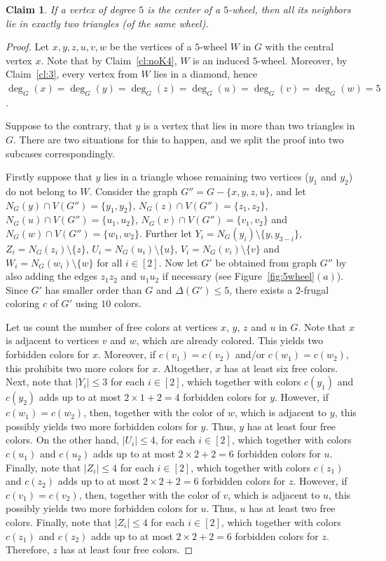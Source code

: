 \documentclass[10pt,a4paper]{article}
\newtheorem{claim}{Claim}
\begin{document}
\begin{claim} If a vertex of degree $5$ is the center of a $5$-wheel, then all its neighbors lie in  exactly two triangles (of the same wheel).
\label{cl:8}
\end{claim} 
\begin{proof}
Let $x,y,z,u,v,w$ be the vertices of a $5$-wheel $W$ in $G$ with the central vertex $x$. 
Note that by Claim~\ref{cl:noK4}, $W$ is an induced $5$-wheel. Moreover, by Claim~\ref{cl:3}, every vertex from $W$ lies in a diamond, hence $\deg_G(x)=\deg_G(y)=\deg_G(z)=\deg_G(u)=\deg_G(v)=\deg_G(w)=5$. 

Suppose to the contrary, that $y$ is a vertex that lies in more than two triangles in $G$. There are two situations for this to happen, and we split the proof into two subcases correspondingly.

Firstly suppose that $y$ lies in a triangle whose remaining two vertices ($y_1$ and $y_2$) do not belong to $W$. Consider the graph $G''=G-\{x,y,z,u\}$, and let $N_G(y) \cap V(G'')=\{y_1,y_2\}$, $N_G(z) \cap V(G'')=\{z_1,z_2\}$, $N_G(u) \cap V(G'')=\{u_1,u_2\}$, $N_G(v) \cap V(G'')=\{v_1,v_2\}$ and $N_G(w) \cap V(G'')=\{w_1,w_2\}$. Further let $Y_i=N_G(y_i)\setminus\{y,y_{3-i}\}$, $Z_i=N_G(z_i)\setminus\{z\}$, $U_i=N_G(u_i)\setminus\{u\}$, $V_i=N_G(v_i)\setminus\{v\}$ and $W_i=N_G(w_i)\setminus\{w\}$ for all $i \in [2]$. %
Now let $G'$ be obtained from graph $G''$ by also adding the edges $z_1z_2$ and $u_1u_2$ if necessary (see Figure~\ref{fig:5wheel}$(a)$). Since $G'$ has smaller order than $G$ and $\Delta(G') \le 5$, there exists a $2$-frugal coloring $c$ of $G'$ using $10$ colors. 

Let us count the number of free colors at vertices $x$, $y$, $z$ and $u$ in $G$. Note that $x$ is adjacent to vertices $v$ and $w$, which are already colored. This yields two forbidden colors for $x$. Moreover, if $c(v_1)=c(v_2)$ and/or $c(w_1)=c(w_2)$, this prohibits two more colors for $x$. Altogether, $x$ has at least six free colors. Next, note that $|Y_i| \le 3$ for each $i\in [2]$, which together with colors $c(y_1)$ and $c(y_2)$ adds up to at most $2 \times 1 + 2=4$ forbidden colors for $y$. However, if $c(w_1)=c(w_2)$, then, together with the color of $w$, which is adjacent to $y$, this possibly yields two more forbidden colors for $y$. Thus, $y$ has at least four free colors. On the other hand, $|U_i|\le 4$, for each $i\in [2]$, which together with colors $c(u_1)$ and $c(u_2)$ adds up to at most $2 \times 2 + 2=6$ forbidden colors for $u$.
Finally, note that $|Z_i| \le 4$ for each $i\in [2]$, which together with colors $c(z_1)$ and $c(z_2)$ adds up to at most $2 \times 2 + 2=6$ forbidden colors for $z$. 
However, if $c(v_1)=c(v_2)$, then, together with the color of $v$, which is adjacent to $u$, this possibly yields two more forbidden colors for $u$. Thus, $u$ has at least two free colors. Finally, note that $|Z_i| \le 4$ for each $i\in [2]$, which together with colors $c(z_1)$ and $c(z_2)$ adds up to at most $2 \times 2 + 2=6$ forbidden colors for $z$. Therefore, $z$ has at least four free colors. 


\end{proof}
\end{document}
